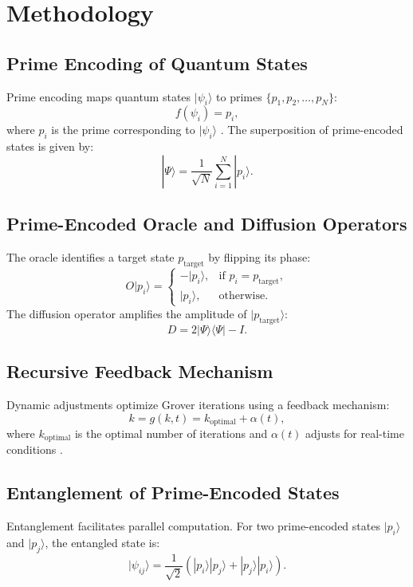 \documentclass{article}
\theoremstyle{plain}
\begin{document}
\section{Methodology}

\subsection{Prime Encoding of Quantum States}
Prime encoding maps quantum states \(|\psi_i\rangle\) to primes \(\{p_1, p_2, \ldots, p_N\}\):
\begin{equation}
f(\psi_i) = p_i,
\end{equation}
where \(p_i\) is the prime corresponding to \(|\psi_i\rangle\) \citep{niven1991}. The superposition of prime-encoded states is given by:
\begin{equation}
|\Psi\rangle = \frac{1}{\sqrt{N}} \sum_{i=1}^{N} |p_i\rangle.
\end{equation}

\subsection{Prime-Encoded Oracle and Diffusion Operators}
The oracle identifies a target state \(p_{\text{target}}\) by flipping its phase:
\begin{equation}
O|p_i\rangle =
\begin{cases}
    -|p_i\rangle, & \text{if } p_i = p_{\text{target}},\\
    |p_i\rangle, & \text{otherwise.}
\end{cases}
\end{equation}
The diffusion operator amplifies the amplitude of \(|p_{\text{target}}\rangle\):
\begin{equation}
D = 2|\Psi\rangle\langle\Psi| - I.
\end{equation}

\subsection{Recursive Feedback Mechanism}
Dynamic adjustments optimize Grover iterations using a feedback mechanism:
\begin{equation}
k = g(k, t) = k_{\text{optimal}} + \alpha(t),
\end{equation}
where \(k_{\text{optimal}}\) is the optimal number of iterations and \(\alpha(t)\) adjusts for real-time conditions \citep{childs2010}.

\subsection{Entanglement of Prime-Encoded States}
Entanglement facilitates parallel computation. For two prime-encoded states \(|p_i\rangle\) and \(|p_j\rangle\), the entangled state is:
\begin{equation}
|\psi_{ij}\rangle = \frac{1}{\sqrt{2}} \left(|p_i\rangle|p_j\rangle + |p_j\rangle|p_i\rangle\right).
\end{equation}
\end{document}
